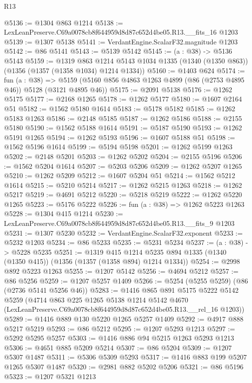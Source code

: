 \begin{lexlean}{R13}
\begin{coremodule}
@5136 := @1304 @863 @1214
@5138 := LexLeanPreserve.C69a0078cb8f644959d8d87c652d4be05.R13.__fits_16 @1203
@5139 := @1307 @5138
@5141 := VerdantEngine.ScalarF32.magnitude @1203
@5142 := @86 @5141
@5143 := @5139 @5142
@5145 := (a : @38) -> @5136 @5143
@5159 := @1319
    @863
    @1214
    @5143
    @1034
    @1335
    (@1340 (@1350 @863))
    (@1356 (@1357 (@1358 @1034) @1214 @1334))
@5160 := @1403 @624
@5174 := fun (a : @38) =>
  @5159 (@5160 @856 @4863 @1263 @4899 (@86 (@2753 @4895 @46)) @5128 (@3121 @4895 @46))
@5175 := @2091 @5138
@5176 := @1262 @5175
@5177 := @2168 @1265
@5178 := @1262 @5177
@5180 := @1607 @2164 @51
@5182 := @1562 @5180 @1614
@5183 := @5178 @5182
@5185 := @1262 @5183 @1263
@5186 := @2148 @5185
@5187 := @1262 @5186
@5188 := @2155 @5180
@5190 := @1562 @5188 @1614
@5191 := @5187 @5190
@5193 := @1262 @5191 @1265
@5194 := @1262 @5193
@5196 := @1607 @5188 @51
@5198 := @1562 @5196 @1614
@5199 := @5194 @5198
@5201 := @1262 @5199 @1263
@5202 := @2148 @5201
@5203 := @1262 @5202
@5204 := @2155 @5196
@5206 := @1562 @5204 @1614
@5207 := @5203 @5206
@5209 := @1262 @5207 @1265
@5210 := @1262 @5209
@5212 := @1607 @5204 @51
@5214 := @1562 @5212 @1614
@5215 := @5210 @5214
@5217 := @1262 @5215 @1263
@5218 := @1262 @5217
@5219 := @4691 @5212
@5220 := @5218 @5219
@5222 := @1262 @5220 @1265
@5223 := @5176 @5222
@5226 := fun (a : @38) => @1262 @5223 @1263
@5228 := @1304 @415 @1214
@5230 := LexLeanPreserve.C69a0078cb8f644959d8d87c652d4be05.R13.__fits_9 @1203
@5231 := @1307 @5230
@5232 := VerdantEngine.ScalarF32.exponent
@5233 := @5232 @1203
@5234 := @86 @5233
@5235 := @5231 @5234
@5237 := (a : @38) -> @5228 @5235
@5251 := @1319
    @415
    @1214
    @5235
    @894
    @1335
    (@1340 (@1350 @415))
    (@1356 (@1357 (@1358 @894) @1214 @1334))
@5254 := @2998 @892 @5223 @1263
@5255 := @1207 @5142
@5256 := @4694 @5212
@5257 := @86 @5256
@5259 := @1207 @5257 @1409
@5266 := @5254 (@5255 @5259) (@86 (@2736 @5141 @5256 @46))
@5283 := @1416
    @865
    @891
    @5175
    @5222
    @5142
    @5259
    (@4714
      @863
      @225
      @1265
      @5138
      @1214
      @5142
      @4670
      (LexLeanPreserve.C69a0078cb8f644959d8d87c652d4be05.R13.__rel_16 @1203))
@5289 := @1416 @889 @130 @5220 @1265 @5257 @1409
@5292 := @4917 @888 @5217 @5219
@5293 := @86 @5212
@5295 := @1207 @5293 @1213
@5297 := @5292 @5295 @5257
@5303 := @1416 @886 @94 @5215 @1263 @5293 @1213
@5306 := @4651 @885 @5209 @5214
@5307 := @86 @5204
@5309 := @1207 @5307 @1487
@5311 := @5306 @5309 @5293
@5317 := @1416 @883 @199 @5207 @1265 @5307 @1487
@5320 := @2981 @882 @5202 @5206
@5321 := @86 @5196
@5323 := @1207 @5321 @1213

\end{coremodule}
\end{lexlean}

